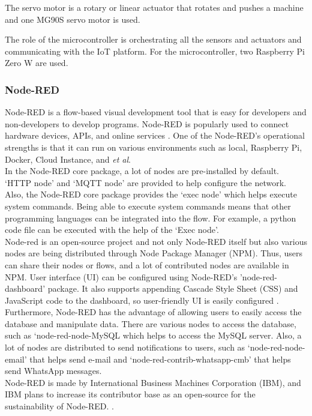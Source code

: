 \documentclass[conference]{IEEEtran}
\begin{document}
The servo motor is a rotary or linear actuator that rotates and pushes a machine \cite{b17} and one MG90S servo motor is used.

The role of the microcontroller is orchestrating all the sensors and actuators and communicating with the IoT platform. For the microcontroller, two Raspberry Pi Zero W are used.

\subsubsection{Node-RED}
Node-RED is a flow-based visual development tool that is easy for developers and non-developers to develop programs. Node-RED is popularly used to connect hardware devices, APIs, and online services \cite{b18}.
One of the Node-RED’s operational strengths is that it can run on various environments such as local, Raspberry Pi, Docker, Cloud Instance, and \textit{et al}. \\
\indent In the Node-RED core package, a lot of nodes are pre-installed by default. ‘HTTP node’ and ‘MQTT node’ are provided to help configure the network. Also, the Node-RED core package provides the ‘exec node’ which helps execute system commands. Being able to execute system commands means that other programming languages can be integrated into the flow. For example, a python code file can be executed with the help of the ‘Exec node’. \\
\indent Node-red is an open-source project and not only Node-RED itself but also various nodes are being distributed through Node Package Manager (NPM). Thus, users can share their nodes or flows, and a lot of contributed nodes are available in NPM.
User interface (UI) can be configured using Node-RED’s ’node-red-dashboard’ package. It also supports appending Cascade Style Sheet (CSS) and JavaScript code to the dashboard, so user-friendly UI is easily configured \cite{b19}. Furthermore, Node-RED has the advantage of allowing users to easily access the database and manipulate data. There are various nodes to access the database, such as ‘node-red-node-MySQL which helps to access the MySQL server. Also, a lot of nodes are distributed to send notifications to users, such as ‘node-red-node-email’ that helps send e-mail and ‘node-red-contrib-whatsapp-cmb’ that helps send WhatsApp messages. \\
\indent Node-RED is made by International Business Machines Corporation (IBM), and IBM plans to increase its contributor base as an open-source for the sustainability of Node-RED. \cite{b20}.
\end{document}

